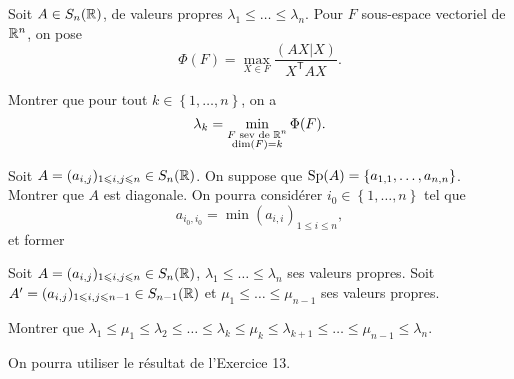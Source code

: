 \documentclass[12pt]{article}
\begin{document}
\begin{exercise}
	Soit $A\in S_n(\mathbb{R})$, de valeurs propres $\lambda_1\leqslant\dots\leqslant\lambda_n$. Pour $F$ sous-espace vectoriel de $\mathbb{R}^{n}$, on pose 
	\begin{equation}
		\Phi(F)=\max\limits_{X\in F}\frac{(AX|X)}{X^{\mathsf{T}}AX}.
	\end{equation}

	Montrer que pour tout $k\in\left\lbrace1,\dots,n\right\rbrace$, on a 
	\begin{equation}
		\lambda_k=\min\limits_{\substack{F\text{ sev de }\mathbb{R}^{n}\\\dim(F)=k}}\Phi(F).
	\end{equation}
\end{exercise}

\begin{exercise}
	Soit $A=(a_{i,j})_{1\leqslant i,j\leqslant n}\in S_n(\mathbb{R})$. On suppose que $\operatorname{Sp}(A)=\left\lbrace a_{1,1},\dots,a_{n,n}\right\rbrace$. Montrer que $A$ est diagonale. On pourra considérer $i_{0}\in\left\lbrace 1,\dots,n\right\rbrace$ tel que 
	\begin{equation*}
		a_{i_{0},i_{0}}=\min(a_{i,i})_{1\leqslant i\leqslant n},
	\end{equation*}et former 
\end{exercise}

\begin{exercise}
	Soit $A=(a_{i,j})_{1\leqslant i,j\leqslant n}\in S_n(\mathbb{R})$, $\lambda_{1}\leqslant \dots\leqslant \lambda_{n}$ ses valeurs propres. Soit $A'=(a_{i,j})_{1\leqslant i,j\leqslant n-1}\in S_{n-1}(\mathbb{R})$ et $\mu_{1}\leqslant\dots\leqslant\mu_{n-1}$ ses valeurs propres.

	Montrer que $\lambda_{1}\leqslant\mu_{1}\leqslant\lambda_{2}\leqslant\dots\leqslant\lambda_{k}\leqslant\mu_k\leqslant\lambda_{k+1}\leqslant\dots\leqslant\mu_{n-1}\leqslant\lambda_n$.

	On pourra utiliser le résultat de l'Exercice 13.
\end{exercise}
\end{document}
